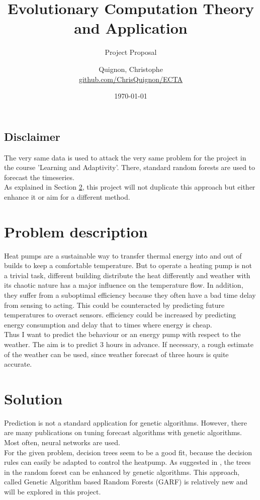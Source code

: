 \documentclass{scrartcl}
\begin{document}
\title{Evolutionary Computation Theory and Application}
\subtitle{Project Proposal}
\author{
  Quignon, Christophe \\
  \href{https://github.com/ChrisQuignon/ECTA}{github.com/ChrisQuignon/ECTA}
} 
\date{\today}


\maketitle

\subsection*{Disclaimer}
The very same data is used to attack the very same problem for the project in the course 'Learning and Adaptivity'. There, standard random forests are used to forecast the timeseries.\\
As explained in Section \ref{sec:Solution}, this project will not duplicate this approach but either enhance it or aim for a different method.

\section{Problem description}
Heat pumps are a sustainable way to transfer thermal energy into and out of  builds to keep a comfortable temperature. But to operate a heating pump is not a trivial task, different building distribute the heat differently and weather with its chaotic nature has a major influence on the temperature flow. In addition, they suffer from a suboptimal efficiency because they often have a bad time delay from sensing to acting. This could be counteracted by predicting future temperatures to overact sensors. efficiency could be increased by predicting energy consumption and delay that to times where energy is cheap.\\
Thus I want to predict the behaviour or an energy pump with respect to the weather. The aim is to predict 3 hours in advance. If necessary, a rough estimate of the weather can be used, since weather forecast of three hours is quite accurate.

\section{Solution}
\label{sec:Solution}

Prediction is not a standard application for genetic algorithms. However, there are many publications on tuning forecast algorithms with genetic algorithms. Most often, neural networks are used.\\
For the given problem, decision trees seem to be a good fit, because the decision rules can easily be adapted to control the heatpump. As suggested in \cite{bader2012garf}, the trees in the random forest can be enhanced by genetic algorithms. This approach, called  Genetic Algorithm based Random Forests (GARF) is relatively new and will be explored in this project.
\end{document}
